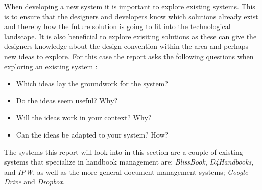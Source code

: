 When developing a new system it is important to explore existing systems.
This is to ensure that the designers and developers know which solutions already exist and thereby how the future solution is going to fit into the technological landscape.
It is also beneficial to explore exisiting solutions as these can give the designers knowledge about the design convention within the area and perhaps new ideas to explore.
For this case the report asks the following questions when exploring an existing system \citep[p.~33]{Rod-Aalborg}:

\begin{itemize}
  \item Which ideas lay the groundwork for the system?
  \item Do the ideas seem useful? Why?
  \item Will the ideas work in your context? Why?
  \item Can the ideas be adapted to your system? How?
\end{itemize}

The systems this report will look into in this section are a couple of existing systems that specialize in handbook management are; \textit{BlissBook}, \textit{D4Handbooks}, and \textit{IPW}, as well as the more general document management systems; \textit{Google Drive} and \textit{Dropbox}.
